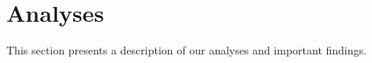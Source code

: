 \section{Analyses}
This section presents a description of our analyses and important findings.





